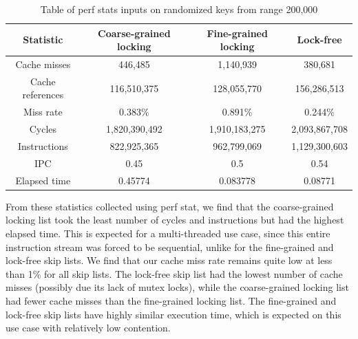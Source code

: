 \documentclass[11pt]{article}
\begin{document}
\begin{table}[ht]
\begin{center}
\begin{tabular}{|c c c c|}
 \hline
 Statistic & Coarse-grained locking & Fine-grained locking & Lock-free \\ 
 \hline \hline
 \hline
 Cache misses & 446,485 & 1,140,939 & 380,681 \\
 \hline
 Cache references & 116,510,375 & 128,055,770 & 156,286,513 \\
 \hline
 Miss rate & 0.383\% & 0.891\% & 0.244\% \\
 \hline
 Cycles & 1,820,390,492 & 1,910,183,275 & 2,093,867,708 \\
 \hline
 Instructions & 822,925,365 & 962,799,069 & 1,129,300,603 \\
 \hline
 IPC & 0.45 & 0.5 & 0.54 \\
 \hline
 Elapsed time & 0.45774 & 0.083778 & 0.08771 \\
 \hline
\end{tabular}
\label{table:1}
\caption{Table of perf stats inputs on randomized keys from range 200,000}
\end{center}
\end{table}

From these statistics collected using perf stat, we find that the coarse-grained locking list took the least number of cycles and instructions but had the highest elapsed time. This is expected for a multi-threaded use case, since this entire instruction stream was forced to be sequential, unlike for the fine-grained and lock-free skip lists. We find that our cache miss rate remains quite low at less than 1\% for all skip lists. The lock-free skip list had the lowest number of cache misses (possibly due its lack of mutex locks), while the coarse-grained locking list had fewer cache misses than the fine-grained locking list. The fine-grained and lock-free skip lists have highly similar execution time, which is expected on this use case with relatively low contention. 
\end{document}
